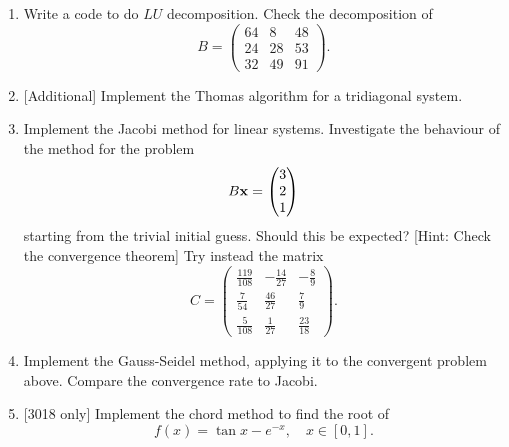 \documentclass[10pt]{article}
\begin{document}
\begin{enumerate}
\item Write a code to do $LU$ decomposition. Check the decomposition of
  \begin{equation*}
    B =
    \begin{pmatrix}
      64 & 8 & 48 \\
      24 & 28 & 53 \\
      32 & 49 & 91
    \end{pmatrix}.
  \end{equation*}
\item{} [Additional] Implement the Thomas algorithm for a tridiagonal
  system.
\item Implement the Jacobi method for linear systems. Investigate the
  behaviour of the method for the problem
  \begin{equation*}
    B {\bf x} =
    \begin{pmatrix}
      3 \\ 2 \\ 1
    \end{pmatrix}
  \end{equation*}
  starting from the trivial initial guess. Should this be expected?
  [Hint: Check the convergence theorem] Try instead the matrix
  \begin{equation*}
    C =
    \begin{pmatrix}
      \frac{119}{108} & -\frac{14}{27} & -\frac{8}{9} \\
      \frac{7}{54} & \frac{46}{27} & \frac{7}{9} \\
      \frac{5}{108} & \frac{1}{27} & \frac{23}{18} 
    \end{pmatrix}.
  \end{equation*}
\item Implement the Gauss-Seidel method, applying it to the
  convergent problem above. Compare the convergence rate to Jacobi.
\item {} [3018 only] Implement the chord method to find the root of
  \begin{equation*}
    f(x) = \tan x - e^{-x}, \quad x \in [0,1].
  \end{equation*}
\end{enumerate}
\end{document}
